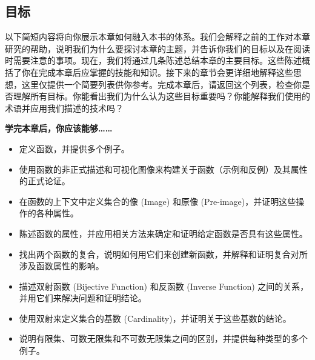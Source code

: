 
\subsection{目标}

以下简短内容将向你展示本章如何融入本书的体系。我们会解释之前的工作对本章研究的帮助，说明我们为什么要探讨本章的主题，并告诉你我们的目标以及在阅读时需要注意的事项。现在，我们将通过几条陈述总结本章的主要目标。这些陈述概括了你在完成本章后应掌握的技能和知识。接下来的章节会更详细地解释这些思想，这里仅提供一个简要列表供你参考。完成本章后，请返回这个列表，检查你是否理解所有目标。你能看出我们为什么认为这些目标重要吗？你能解释我们使用的术语并应用我们描述的技术吗？

\textbf{学完本章后，你应该能够……}

\begin{itemize}
    \item 定义函数，并提供多个例子。
    \item 使用函数的非正式描述和可视化图像来构建关于函数（示例和反例）及其属性的正式论证。
    \item 在函数的上下文中定义集合的像 (Image) 和原像 (Pre-image)，并证明这些操作的各种属性。
    \item 陈述函数的属性，并应用相关方法来确定和证明给定函数是否具有这些属性。
    \item 找出两个函数的复合，说明如何用它们来创建新函数，并解释和证明复合对所涉及函数属性的影响。
    \item 描述双射函数 (Bijective Function) 和反函数 (Inverse Function) 之间的关系，并用它们来解决问题和证明结论。
    \item 使用双射来定义集合的基数 (Cardinality)，并证明关于这些基数的结论。
    \item 说明有限集、可数无限集和不可数无限集之间的区别，并提供每种类型的多个例子。
\end{itemize}
